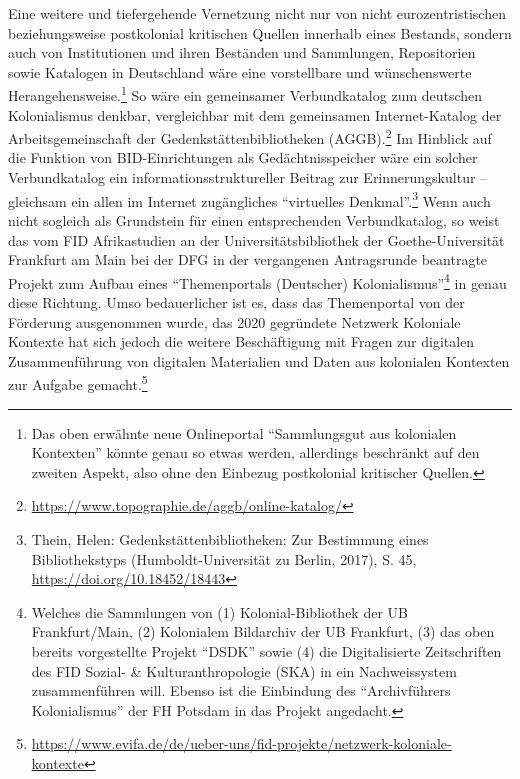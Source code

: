 \documentclass[a4paper,
fontsize=11pt,
oneside,
numbers=noperiodatend,
parskip=half-,
bibliography=totoc,
final
]{scrartcl}
\begin{document}
Eine weitere und tiefergehende Vernetzung nicht nur von nicht
eurozentristischen beziehungsweise postkolonial kritischen Quellen
innerhalb eines Bestands, sondern auch von Institutionen und ihren
Beständen und Sammlungen, Repositorien sowie Katalogen in Deutschland
wäre eine vorstellbare und wünschenswerte Herangehensweise.\footnote{Das
  oben erwähnte neue Onlineportal \enquote{Sammlungsgut aus kolonialen
  Kontexten} könnte genau so etwas werden, allerdings beschränkt auf den
  zweiten Aspekt, also ohne den Einbezug postkolonial kritischer
  Quellen.} So wäre ein gemeinsamer Verbundkatalog zum deutschen
Kolonialismus denkbar, vergleichbar mit dem gemeinsamen Internet-Katalog
der Arbeitsgemeinschaft der Gedenkstättenbibliotheken (AGGB).\footnote{\url{https://www.topographie.de/aggb/online-katalog/}}
Im Hinblick auf die Funktion von BID-Einrichtungen als
Gedächtnisspeicher wäre ein solcher Verbundkatalog ein
informationsstruktureller Beitrag zur Erinnerungskultur -- gleichsam ein
allen im Internet zugängliches \enquote{virtuelles Denkmal}.\footnote{Thein,
  Helen: Gedenkstättenbibliotheken: Zur Bestimmung eines Bibliothekstyps
  (Humboldt-Universität zu Berlin, 2017), S. 45,
  \url{https://doi.org/10.18452/18443}} Wenn auch nicht sogleich als
Grundstein für einen entsprechenden Verbundkatalog, so weist das vom FID
Afrikastudien an der Universitätsbibliothek der Goethe-Universität
Frankfurt am Main bei der DFG in der vergangenen Antragsrunde beantragte
Projekt zum Aufbau eines \enquote{Themenportals (Deutscher)
Kolonialismus}\footnote{Welches die Sammlungen von (1)
  Kolonial-Bibliothek der UB Frankfurt/Main, (2) Kolonialem Bildarchiv
  der UB Frankfurt, (3) das oben bereits vorgestellte Projekt
  \enquote{DSDK} sowie (4) die Digitalisierte Zeitschriften des FID
  Sozial- \& Kulturanthropologie (SKA) in ein Nachweissystem
  zusammenführen will. Ebenso ist die Einbindung des
  \enquote{Archivführers Kolonialismus} der FH Potsdam in das Projekt
  angedacht.} in genau diese Richtung. Umso bedauerlicher ist es, dass
das Themenportal von der Förderung ausgenommen wurde, das 2020
gegründete Netzwerk Koloniale Kontexte hat sich jedoch die weitere
Beschäftigung mit Fragen zur digitalen Zusammenführung von digitalen
Materialien und Daten aus kolonialen Kontexten zur Aufgabe
gemacht.\footnote{\url{https://www.evifa.de/de/ueber-uns/fid-projekte/netzwerk-koloniale-kontexte}}
\end{document}
